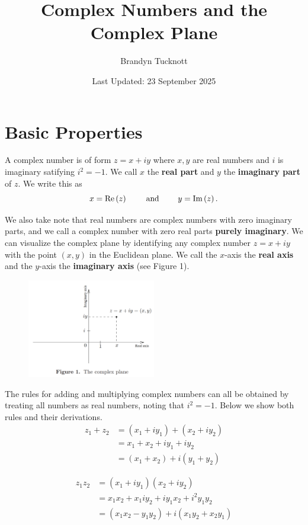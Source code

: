 \documentclass{exam}
\title{Complex Numbers and the Complex Plane}
\author{Brandyn Tucknott}
\date{Last Updated: 23 September 2025}
\begin{document}
\maketitle

\section{Basic Properties}
A complex number is of form $z = x + iy$ where $x,y$ are real numbers and $i$ is imaginary
satifying $i^2 = -1$. We call $x$ the \textbf{real part} and $y$ the \textbf{imaginary part} 
of $z$. We write this as 
$$x = \text{Re}\left( z \right) \qquad \text{ and } \qquad y = \text{Im}\left( z \right).$$

We also take note that real numbers are complex numbers with zero imaginary parts, and we call a 
complex number with zero real parts \textbf{purely imaginary}. We can visualize the complex plane
by identifying any complex number $z = x + iy$ with the point $(x, y)$ in the Euclidean plane. We
call the $x$-axis the \textbf{real axis} and the $y$-axis the \textbf{imaginary axis} (see Figure 1).

\begin{figure}[H]
    \centering
    \includegraphics[width=0.5\textwidth]{figures/complex_analysis/figure_1.png}
\end{figure}

The rules for adding and multiplying complex numbers can all be obtained by treating all numbers as
real numbers, noting that $i^2 = -1$. Below we show both rules and their derivations.
\begin{align*}
    z_1 + z_2 &= (x_1 + iy_1) + (x_2 + iy_2) \\
    &= x_1 + x_2 + iy_1 + iy_2 \\
    &= (x_1 + x_2) + i(y_1 + y_2)
\end{align*}

\begin{align*}
    z_1 z_2 &= (x_1 + iy_1)(x_2 + iy_2) \\
    &= x_1x_2 + x_1iy_2 + iy_1x_2 + i^2y_1y_2 \\
    &= (x_1x_2 - y_1y_2) + i(x_1y_2 + x_2y_1)
\end{align*}
\end{document}
